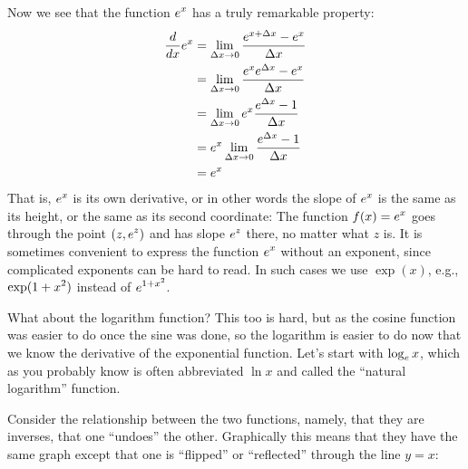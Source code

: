 Now we see that the function $\displaystyle e^x$ has a truly remarkable property:
\begin{align*}
{d\over dx}e^x&=\lim_{\Delta x\to 0} {e^{x+\Delta x}-e^x\over \Delta x} \\
&=\lim_{\Delta x\to 0} {e^xe^{\Delta x}-e^x\over \Delta x} \\
&=\lim_{\Delta x\to 0} e^x{e^{\Delta x}-1\over \Delta x} \\
&=e^x\lim_{\Delta x\to 0} {e^{\Delta x}-1\over \Delta x} \\
&=e^x \\
\end{align*}
That is, $\displaystyle e^x$ is its own derivative, or in other words the
slope of $\displaystyle e^x$ is the same as its height, or the same as its second
coordinate: The function $\displaystyle f(x)=e^x$ goes through the point $\displaystyle (z,e^z)$
and has slope $\displaystyle e^z$ there, no matter what $z$ is. It is sometimes
convenient to express the function $\displaystyle e^x$ without an exponent, since
complicated exponents can be hard to read. In such cases we use
$\exp(x)$, e.g., $\displaystyle \exp(1+x^2)$ instead of 
$\displaystyle e^{1+x^2}$.

What about the logarithm function? This too is hard, but as the
cosine function was easier to do once the sine was done, so the
logarithm is easier to do now that we know the derivative of the
exponential function. Let's start with $\displaystyle \log_e x$, which as you
probably know is often abbreviated $\ln x$ and called the ``natural
logarithm'' function.

Consider the relationship between the two functions,
namely, that they are inverses, that one ``undoes'' the
other. Graphically this means that they have the same graph except
that one is ``flipped'' or ``reflected'' through the line $y=x$:


